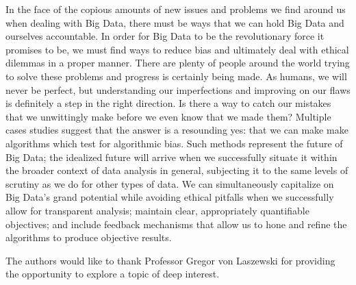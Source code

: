 \documentclass[sigconf]{acmart}
\begin{document}
In the face of the copious amounts of new issues and problems we find around us when dealing with Big Data, there must be ways that we can hold Big Data and ourselves accountable. In order for Big Data to be the revolutionary force it promises to be, we must find ways to reduce bias and ultimately deal with ethical dilemmas in a proper manner. There are plenty of people around the world trying to solve these problems and progress is certainly being made. As humans, we will never be perfect, but understanding our imperfections and improving on our flaws is definitely a step in the right direction. Is there a way to catch our mistakes that we unwittingly make before we even know that we made them? Multiple cases studies suggest that the answer is a resounding yes: that we can make make algorithms which test for algorithmic bias. Such methods represent the future of Big Data; the idealized future will arrive when we successfully situate it within the broader context of data analysis in general, subjecting it to the same levels of scrutiny as we do for other types of data. We can simultaneously capitalize on Big Data's grand potential while avoiding ethical pitfalls when we successfully allow for transparent analysis; maintain clear, appropriately quantifiable objectives; and include feedback mechanisms that allow us to hone and refine the algorithms to produce objective results. 


\begin{acks}
The authors would like to thank Professor Gregor von Laszewski for providing the opportunity to explore a topic of deep interest.

\end{acks}



 
\end{document}
